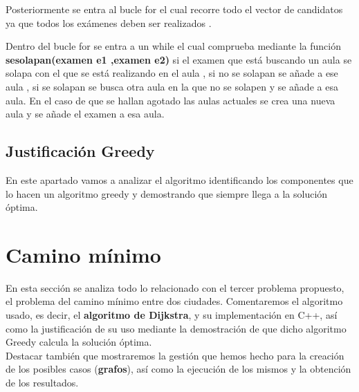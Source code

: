 \documentclass[11pt,openany]{book}
\begin{document}
Posteriormente se entra al bucle for el cual recorre todo el vector de candidatos ya que todos los exámenes deben
ser realizados . 

Dentro del bucle for se entra a un while el cual comprueba mediante la función \textbf{sesolapan(examen e1 ,examen e2)}
si el examen que está buscando un aula se solapa con el que se está realizando en el aula , si no se solapan se añade a 
ese aula , si se solapan se busca otra aula en la que no se solapen y se añade a esa aula. En el caso de que se hallan agotado
las aulas actuales se crea una nueva aula y se añade el examen a esa aula.

\section{Justificación Greedy}

En este apartado vamos a analizar el algoritmo identificando los componentes que lo hacen un algoritmo greedy 
y demostrando que siempre llega a la solución óptima. 


\chapter{Camino mínimo} %
En esta sección se analiza todo lo relacionado con el tercer problema propuesto, el problema del camino mínimo entre dos ciudades. 
Comentaremos el algoritmo usado, es decir, el \textbf{algoritmo de Dijkstra}, y su implementación en C++, así como la justificación de su uso mediante
la demostración de que dicho algoritmo Greedy calcula la solución óptima.  \\
Destacar también que mostraremos la gestión que hemos hecho para la creación de los posibles casos (\textbf{grafos}), así como la 
ejecución de los mismos y la obtención de los resultados.
\end{document}
